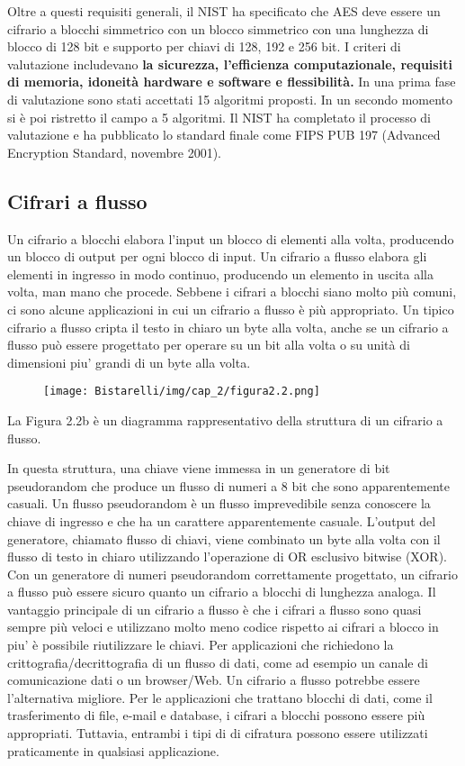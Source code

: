 \singlespacing

Oltre a questi requisiti generali, il NIST ha specificato che AES deve essere un cifrario a blocchi simmetrico con un blocco simmetrico con una lunghezza di blocco di 128 bit e supporto per chiavi di 128, 192 e 256 bit. 
I criteri di valutazione includevano \textbf{la sicurezza, l'efficienza computazionale, requisiti di memoria, idoneità hardware e software e flessibilità.} In una prima fase di valutazione sono stati accettati 15 algoritmi proposti. In un secondo momento si è poi ristretto il campo a 5 algoritmi. Il NIST ha completato il processo di valutazione e ha pubblicato lo standard finale come FIPS PUB 197 (Advanced Encryption Standard, novembre 2001). 

\subsection{Cifrari a flusso}
Un cifrario a blocchi elabora l'input un blocco di elementi alla volta, producendo un blocco di output per ogni blocco di input. Un cifrario a flusso elabora gli elementi in ingresso in modo continuo, producendo un elemento in uscita alla volta, man mano che procede. Sebbene i cifrari a blocchi siano molto più comuni, ci sono alcune applicazioni in cui un cifrario a flusso è più appropriato. Un tipico cifrario a flusso cripta il testo in chiaro un byte alla volta, anche se un cifrario a flusso può essere progettato per operare su un bit alla volta o su unità di dimensioni piu' grandi di un byte alla volta.

\begin{figure}[H]
	\centering
    \texttt{[image: Bistarelli/img/cap\_2/figura2.2.png]}
\end{figure}

La Figura 2.2b è un diagramma rappresentativo della struttura di un cifrario a flusso. 

\singlespacing

In questa struttura, una chiave viene immessa in un generatore di bit pseudorandom che produce un flusso di numeri a 8 bit che sono apparentemente casuali. Un flusso pseudorandom è un flusso imprevedibile senza conoscere la chiave di ingresso e che ha un carattere apparentemente casuale. L'output del generatore, chiamato flusso di chiavi, viene combinato un byte alla volta con il flusso di testo in chiaro utilizzando l'operazione di OR esclusivo bitwise (XOR). Con un generatore di numeri pseudorandom correttamente progettato, un cifrario a flusso può essere sicuro quanto un cifrario a blocchi di lunghezza analoga. Il vantaggio principale di un cifrario a flusso è che i cifrari a flusso sono quasi sempre più veloci e utilizzano molto meno codice rispetto ai cifrari a blocco in piu' è possibile riutilizzare le chiavi. Per applicazioni che richiedono la crittografia/decrittografia di un flusso di dati, come ad esempio un canale di comunicazione dati o un browser/Web. Un cifrario a flusso potrebbe essere l'alternativa migliore. Per le applicazioni che trattano blocchi di dati, come il trasferimento di file, e-mail e database, i cifrari a blocchi possono essere più appropriati. Tuttavia, entrambi i tipi di di cifratura possono essere utilizzati praticamente in qualsiasi applicazione.

